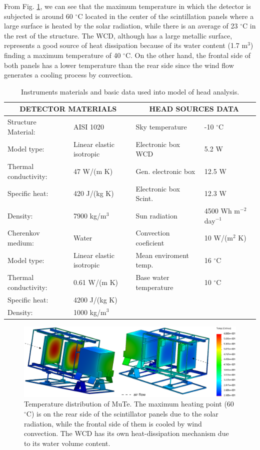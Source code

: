 \documentclass[letterpaper,11pt]{article}
\begin{document}
From Fig. \ref{fig:temp_graph}, we can see that the maximum temperature in which the detector is subjected is around 60 $^{\circ}$C located in the center of the scintillation panels where a large surface is heated by the solar radiation, while there is an average of 23 $^{\circ}$C in the rest of the structure. The WCD, although has a large metallic surface, represents a good source of heat dissipation because of its water content (1.7 m$^3$) finding a maximum temperature of 40 $^{\circ}$C. On the other hand, the frontal side of both panels has a lower temperature than the rear side since the wind flow generates a cooling process by convection.

\begin{table}[!ht]
\begin{center}
\begin{tabular}{ll|ll}
\hline
\multicolumn{2}{c}{\bf DETECTOR MATERIALS} & \multicolumn{2}{|c}{\bf HEAD SOURCES DATA}\\
\hline
Structure Material: & AISI 1020 & Sky temperature & -10 $^{\circ}$C \\
Model type: & Linear elastic isotropic & Electronic box WCD & 5.2 W \\
Thermal conductivity: & 47 W/(m K) & Gen. electronic box & 12.5 W \\
Specific heat: & 420 J/(kg K) & Electronic box Scint. & 12.3 W \\
Density: & 7900 kg/m$^3$ & Sun radiation & 4500 Wh m$^{-2}$ day$^{-1}$ \\
Cherenkov medium: & Water & Convection coeficient & 10 W/(m$^2$ K) \\
Model type: & Linear elastic isotropic & Mean enviroment temp. & 16 $^{\circ}$C \\
Thermal conductivity: & 0.61 W/(m K) & Base water temperature & 10 $^{\circ}$C \\
Specific heat: & 4200 J/(kg K) & & \\
Density: & 1000 kg/m$^3$ & & \\ 
\hline
\end{tabular}
\end{center}
\caption{Instruments materials and basic data used into model of head analysis.}
\label{instr_mat}
\end{table}

\begin{figure}[htb]
\centering
\includegraphics[width=1\columnwidth]{Figures/MuTe_Temp.eps}
\caption{Temperature distribution of MuTe. The maximum heating point (60 $^{\circ}$C) is on the rear side of the scintillator panels due to the solar radiation, while the frontal side of them is cooled by wind convection. The WCD has its own heat-dissipation mechanism due to its water volume content.}
\label{fig:temp_graph}
\end{figure}
\end{document}
